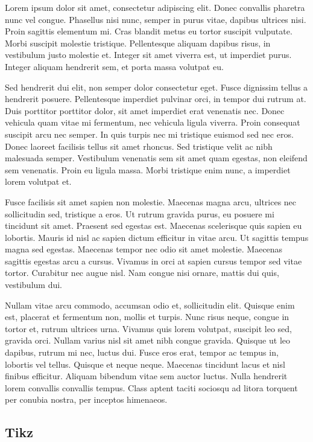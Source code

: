Lorem ipsum dolor sit amet, consectetur adipiscing elit. Donec convallis pharetra nunc vel congue. Phasellus nisi nunc, semper in purus vitae, dapibus ultrices nisi. Proin sagittis elementum mi. Cras blandit metus eu tortor suscipit vulputate. Morbi suscipit molestie tristique. Pellentesque aliquam dapibus risus, in vestibulum justo molestie et. Integer sit amet viverra est, ut imperdiet purus. Integer aliquam hendrerit sem, et porta massa volutpat eu.

Sed hendrerit dui elit, non semper dolor consectetur eget. Fusce dignissim tellus a hendrerit posuere. Pellentesque imperdiet pulvinar orci, in tempor dui rutrum at. Duis porttitor porttitor dolor, sit amet imperdiet erat venenatis nec. Donec vehicula quam vitae mi fermentum, nec vehicula ligula viverra. Proin consequat suscipit arcu nec semper. In quis turpis nec mi tristique euismod sed nec eros. Donec laoreet facilisis tellus sit amet rhoncus. Sed tristique velit ac nibh malesuada semper. Vestibulum venenatis sem sit amet quam egestas, non eleifend sem venenatis. Proin eu ligula massa. Morbi tristique enim nunc, a imperdiet lorem volutpat et.

Fusce facilisis sit amet sapien non molestie. Maecenas magna arcu, ultrices nec sollicitudin sed, tristique a eros. Ut rutrum gravida purus, eu posuere mi tincidunt sit amet. Praesent sed egestas est. Maecenas scelerisque quis sapien eu lobortis. Mauris id nisl ac sapien dictum efficitur in vitae arcu. Ut sagittis tempus magna sed egestas. Maecenas tempor nec odio sit amet molestie. Maecenas sagittis egestas arcu a cursus. Vivamus in orci at sapien cursus tempor sed vitae tortor. Curabitur nec augue nisl. Nam congue nisi ornare, mattis dui quis, vestibulum dui.

Nullam vitae arcu commodo, accumsan odio et, sollicitudin elit. Quisque enim est, placerat et fermentum non, mollis et turpis. Nunc risus neque, congue in tortor et, rutrum ultrices urna. Vivamus quis lorem volutpat, suscipit leo sed, gravida orci. Nullam varius nisl sit amet nibh congue gravida. Quisque ut leo dapibus, rutrum mi nec, luctus dui. Fusce eros erat, tempor ac tempus in, lobortis vel tellus. Quisque et neque neque. Maecenas tincidunt lacus et nisl finibus efficitur. Aliquam bibendum vitae sem auctor luctus. Nulla hendrerit lorem convallis convallis tempus. Class aptent taciti sociosqu ad litora torquent per conubia nostra, per inceptos himenaeos.

\subsection{Tikz}


